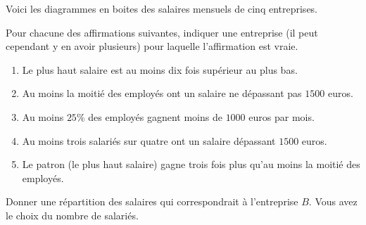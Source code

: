 
\begin{exercice}\label{exosmath-0249}

    Voici les diagrammes en boites des salaires mensuels de cinq entreprises. 

    \begin{center}

    \end{center}

Pour chacune des affirmations suivantes, indiquer une entreprise (il peut cependant y en avoir plusieurs) pour laquelle l'affirmation est vraie. 
\begin{enumerate}
    \item
        Le plus haut salaire est au moins dix fois supérieur au plus bas.
    \item
        Au moins la moitié des employés ont un salaire ne dépassant pas \( 1500\) euros.
    \item
        Au moins \( 25\%\) des employés gagnent moins de \( 1000\) euros par mois.
    \item
        Au moins trois salariés sur quatre ont un salaire dépassant \( 1500\) euros.
    \item
        Le patron (le plus haut salaire) gagne trois fois plus qu'au moins la moitié des employés.
\end{enumerate}

Donner une répartition des salaires qui correspondrait à l'entreprise \( B\). Vous avez le choix du nombre de salariés.

\end{exercice}
